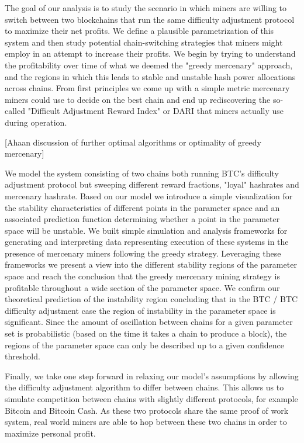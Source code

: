 \documentclass[10pt, preprint]{aastex}
\begin{document}
The goal of our analysis is to study the scenario in which miners are willing to switch between two blockchains that run the same difficulty adjustment protocol to maximize their net profits.  We define a plausible parametrization of this system and then study potential chain-switching strategies that miners might employ in an attempt to increase their profits.  We begin by trying to understand the profitability over time of what we deemed the "greedy mercenary" approach, and the regions in which this leads to stable and unstable hash power allocations across chains.  From first principles we come up with a simple metric mercenary miners could use to decide on the best chain and end up rediscovering the so-called "Difficult Adjustment Reward Index" or DARI that miners actually use during operation. 

[Ahaan discussion of further optimal algorithms or optimality of greedy mercenary]

We model the system consisting of two chains both running BTC's difficulty adjustment protocol but sweeping different reward fractions, "loyal" hashrates and mercenary hashrate.  Based on our model we introduce a simple visualization for the stability characteristics of different points in the parameter space and an associated prediction function determining whether a point in the parameter space will be unstable. We built simple simulation and analysis frameworks for generating and interpreting data representing execution of these systems in the presence of mercenary miners following the greedy strategy.  Leveraging these frameworks we present a view into the different stability regions of the parameter space and reach the conclusion that the greedy mercenary mining strategy is profitable throughout a wide section of the parameter space.  We confirm our theoretical prediction of the instability region concluding that in the BTC / BTC difficulty adjustment case the region of instability in the parameter space is significant. Since the amount of oscillation between chains for a given parameter set is probabilistic (based on the time it takes a chain to produce a block), the regions of the parameter space can only be described up to a given confidence threshold. 

Finally, we take one step forward in relaxing our model's assumptions by allowing the difficulty adjustment algorithm to differ between chains. This allows us to simulate competition between chains with slightly different protocols, for example Bitcoin and Bitcoin Cash. As these two protocols share the same proof of work system, real world miners are able to hop between these two chains in order to maximize personal profit.
\end{document}
